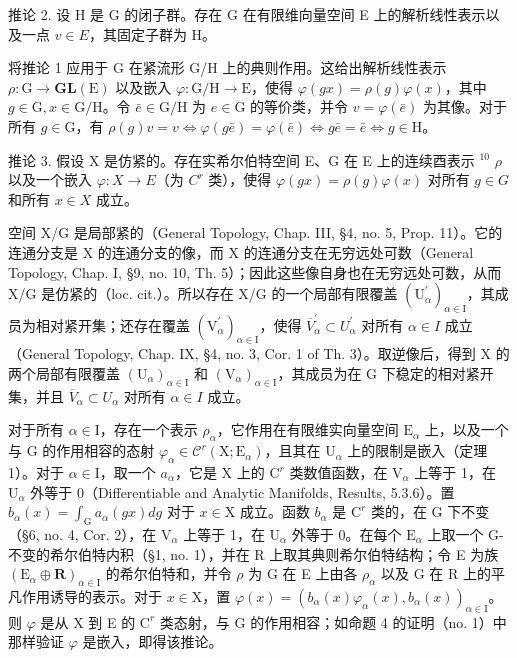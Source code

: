 推论 2. 设 H 是 G 的闭子群。存在 G 在有限维向量空间 E 上的解析线性表示以及一点 \(v \in E\)，其固定子群为 H。

将推论 1 应用于 G 在紧流形 G/H 上的典则作用。这给出解析线性表示 \(\rho: \mathrm{G} \to \mathbf{GL}(\mathrm{E})\) 以及嵌入 \(\varphi: \mathrm{G} / \mathrm{H} \to \mathrm{E}\)，使得 \(\varphi(gx) = \rho(g)\varphi(x)\)，其中 \(g \in \mathrm{G}, x \in \mathrm{G} / \mathrm{H}\)。令 \(\bar{e} \in \mathrm{G} / \mathrm{H}\) 为 \(e \in \mathrm{G}\) 的等价类，并令 \(v = \varphi(\bar{e})\) 为其像。对于所有 \(g \in \mathrm{G}\)，有 \(\rho(g)v = v \Longleftrightarrow \varphi(g\bar{e}) = \varphi(\bar{e}) \Longleftrightarrow g\bar{e} = \bar{e} \Longleftrightarrow g \in \mathrm{H}\)。

推论 3. 假设 X 是仿紧的。存在实希尔伯特空间 E、G 在 E 上的连续酉表示 \({}^{10}\) \(\rho\) 以及一个嵌入 \(\varphi: X \to E\)（为 \(C^{r}\) 类），使得 \(\varphi(gx) = \rho(g)\varphi(x)\) 对所有 \(g \in G\) 和所有 \(x \in X\) 成立。

空间 X/G 是局部紧的（General Topology, Chap. III, §4, no. 5, Prop. 11）。它的连通分支是 X 的连通分支的像，而 X 的连通分支在无穷远处可数（General Topology, Chap. I, §9, no. 10, Th. 5）；因此这些像自身也在无穷远处可数，从而 X/G 是仿紧的（loc. cit.）。所以存在 X/G 的一个局部有限覆盖 \((\mathrm{U}_{\alpha}^{\prime})_{\alpha\in\mathrm{I}}\)，其成员为相对紧开集；还存在覆盖 \((\mathrm{V}_{\alpha}^{\prime})_{\alpha\in\mathrm{I}}\)，使得 \(\overline{V}_{\alpha}^{\prime}\subset U_{\alpha}^{\prime}\) 对所有 \(\alpha\in I\) 成立（General Topology, Chap. IX, §4, no. 3, Cor. 1 of Th. 3）。取逆像后，得到 X 的两个局部有限覆盖 \((\mathrm{U}_{\alpha})_{\alpha\in\mathrm{I}}\) 和 \((\mathrm{V}_{\alpha})_{\alpha\in\mathrm{I}}\)，其成员为在 G 下稳定的相对紧开集，并且 \(\overline{V}_{\alpha}\subset U_{\alpha}\) 对所有 \(\alpha\in I\) 成立。

对于所有 \(\alpha \in \mathrm{I}\)，存在一个表示 \(\rho_{\alpha}\)，它作用在有限维实向量空间 \(\mathrm{E}_{\alpha}\) 上，以及一个与 G 的作用相容的态射 \(\varphi_{\alpha} \in \mathcal{C}^r (\mathrm{X};\mathrm{E}_{\alpha})\)，且其在 \(\mathrm{U}_{\alpha}\) 上的限制是嵌入（定理 1）。对于 \(\alpha \in \mathrm{I}\)，取一个 \(a_{\alpha}\)，它是 X 上的 \(\mathrm{C}^r\) 类数值函数，在 \(\mathrm{V}_{\alpha}\) 上等于 1，在 \(\mathrm{U}_{\alpha}\) 外等于 0（Differentiable and Analytic Manifolds, Results, 5.3.6）。置 \(b_{\alpha}(x) = \int_{\mathrm{G}} a_{\alpha}(gx) dg\) 对于 \(x \in \mathrm{X}\) 成立。函数 \(b_{\alpha}\) 是 \(\mathrm{C}^r\) 类的，在 G 下不变（§6, no. 4, Cor. 2），在 \(\mathrm{V}_{\alpha}\) 上等于 1，在 \(\mathrm{U}_{\alpha}\) 外等于 0。在每个 \(\mathrm{E}_{\alpha}\) 上取一个 G-不变的希尔伯特内积（§1, no. 1），并在 R 上取其典则希尔伯特结构；令 E 为族 \((\mathrm{E}_{\alpha} \oplus \mathbf{R})_{\alpha \in \mathrm{I}}\) 的希尔伯特和，并令 \(\rho\) 为 G 在 E 上由各 \(\rho_{\alpha}\) 以及 G 在 R 上的平凡作用诱导的表示。对于 \(x \in \mathrm{X}\)，置 \(\varphi(x) = (b_{\alpha}(x)\varphi_{\alpha}(x), b_{\alpha}(x))_{\alpha \in \mathrm{I}}\)。则 \(\varphi\) 是从 X 到 E 的 \(\mathrm{C}^r\) 类态射，与 G 的作用相容；如命题 4 的证明（no. 1）中那样验证 \(\varphi\) 是嵌入，即得该推论。


